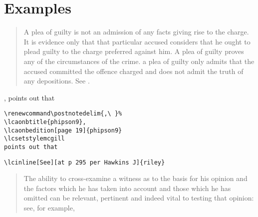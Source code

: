 \newpage
\lcsetstylemcgill
\section{Examples}

\begin{quotation}
A plea of guilty is not an
admission of any facts giving rise to the charge. It is
evidence only that that particular accused considers that he
ought to plead guilty to the charge preferred against him. A
plea of guilty  proves any of the circumstances of the
crime.  a
plea of guilty only admits that the accused committed the
offence charged and does not admit the truth of any
depositions. See . 
\end{quotation}

\renewcommand\postnotedelim{,\ }%
, 
\lcsetstylemcgill
points out that

\renewcommand\postnotedelim{,\ }%
\fbox{, }
\lcsetstylemcgill
{}


\begin{magpar}
\begin{verbatim}
\renewcommand\postnotedelim{,\ }%
\lcaonbtitle{phipson9}, 
\lcaonbedition[page 19]{phipson9} 
\lcsetstylemcgill
points out that
\end{verbatim}
\end{magpar}


\bigskip
{}


\begin{magpar}
\begin{verbatim}
\lcinline[See][at p 295 per Hawkins J]{riley}
\end{verbatim}
\end{magpar}

%

\newpage
\begin{quotation}
The ability to cross-examine a witness as to the basis for his opinion and the factors which he has taken into account and those which he has omitted can be relevant, pertinent and indeed vital to testing  that opinion: see, for example, 
\end{quotation}


